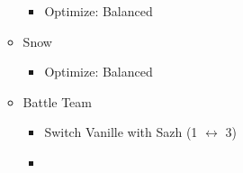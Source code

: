 \begin{menu}
\begin{itemize}
\begin{itemize}
\begin{itemize}
					      \item Optimize: Balanced
				      \end{itemize}
				\item Snow
				      \begin{itemize}
					      \item Optimize: Balanced
				      \end{itemize}
			\end{itemize}
			\paradigm
			\begin{itemize}
				\item Battle Team
				      \begin{itemize}
					      \item Switch Vanille with Sazh (1 $\leftrightarrow$ 3)
					      \item {}%
					            {\paradigmline{\com}{\com}{\med}}%
					            {\paradigmline[2]{\textit{\com}}{\textit{\com}}{\textit{(\rav)}}}%
					            {\paradigmline{(\sen)}{\sen}{(\med)}}%
					            {\paradigmline{\syn}{\rav}{\rav}}%
					            {\paradigmline{\rav}{\rav}{\sab}}%
					            {\paradigmline{\rav}{\rav}{\rav}}
				      \end{itemize}
			\end{itemize}
		\end{itemize}
	\end{menu}
	\vfill
	\renewcommand{\first}{[1] Tireless Charge (\com)/\com/\med)}
	\renewcommand{\second}{[2] Aggression (\com/\com/\rav)}
	\renewcommand{\third}{[3] Consolidation (\sen/\sen/\med)}
	\renewcommand{\fourth}{[4] Malevolence (\syn/(\rav)/\rav)}
	\renewcommand{\fifth}{[5] Smart Bomb (\rav/\rav/\sab)}
	\renewcommand{\sixth}{[6] Tri-Disaster (\rav/\rav/\rav)}
